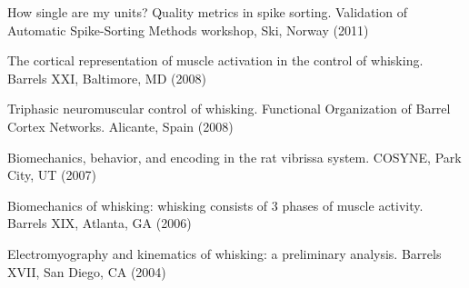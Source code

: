 \documentclass[line,11pt]{res}
\begin{document}
\begin{resume}
How single are my units? Quality metrics in spike sorting. Validation of Automatic Spike-Sorting Methods workshop, Ski, Norway (2011)

The cortical representation of muscle activation in the control of whisking. Barrels XXI, Baltimore, MD (2008)

Triphasic neuromuscular control of whisking. Functional Organization of Barrel Cortex Networks. Alicante, Spain (2008)

Biomechanics, behavior, and encoding in the rat vibrissa system. COSYNE, Park City, UT (2007)

Biomechanics of whisking: whisking consists of 3 phases of muscle activity. Barrels XIX, Atlanta, GA (2006)

Electromyography and kinematics of whisking: a preliminary analysis. Barrels XVII, San Diego, CA (2004)

\end{resume}
\end{document}
